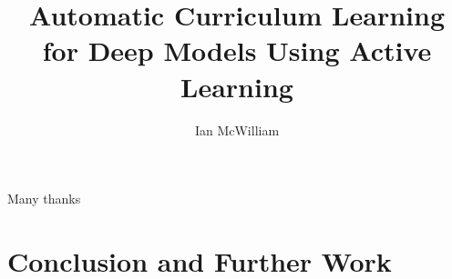 \documentclass[msc,ai,leftchapter,deptreport]{infthesis}  %
\title{Automatic Curriculum Learning for Deep Models Using Active Learning}
\author{Ian McWilliam}
\begin{document}
\begin{preliminary}

\maketitle

\begin{acknowledgements}
Many thanks
\end{acknowledgements}

\standarddeclaration

\tableofcontents


\end{preliminary}









%







\chapter{Conclusion and Further Work}

% 
%



\singlespace




\end{document}
